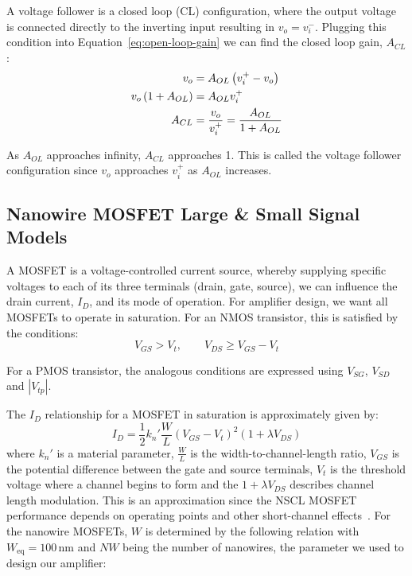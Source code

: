 \documentclass[11pt,a4paper]{article}
\begin{document}
A voltage follower is a closed loop (CL) configuration, where the output voltage is connected directly to the inverting input resulting in $v_o = v_i^-$. Plugging this condition into Equation~\eqref{eq:open-loop-gain} we can find the closed loop gain, $A_{CL}$:
\begin{align}
    v_o &= A_{OL}\left(v_i^+ - v_o\right) \notag \\
    v_o\left(1 + A_{OL}\right) &= A_{OL}v_i^+ \notag \\
    A_{CL}
        &= \frac{v_o}{v_i^+}
        = \frac{A_{OL}}{1 + A_{OL}}
    \label{eq:closed-loop-gain}
\end{align}

As $A_{OL}$ approaches infinity, $A_{CL}$ approaches 1. This is called the voltage follower configuration since $v_o$ approaches $v_i^+$ as $A_{OL}$ increases.
\subsection{Nanowire MOSFET Large \& Small Signal Models}

A MOSFET is a voltage-controlled current source, whereby supplying specific voltages to each of its three terminals (drain, gate, source), we can influence the drain current, ${I}_{D}$, and its mode of operation. For amplifier design, we want all MOSFETs to operate in saturation. For an NMOS transistor, this is satisfied by the conditions:
\begin{equation}
    V_{GS}>V_t, \qquad V_{DS} \geq V_{GS} - V_t
    \label{eq:saturation-condition}
\end{equation}

For a PMOS transistor, the analogous conditions are expressed using $V_{SG}$, $V_{SD}$ and $|V_{tp}|$.

The $I_D$ relationship for a MOSFET in saturation is approximately given by:
\begin{equation}
    {I}_{D}=\frac{1}{2}{k}_{n}'\frac{W}{L}({V}_{GS}-{V}_{t})^{2}(1 + \lambda V_{DS})
    \label{eq:mosfet-current}
\end{equation}
where ${k}_{n}'$ is a material parameter, $\frac{W}{L}$ is the width-to-channel-length ratio, ${V}_{GS}$ is the potential difference between the gate and source terminals, ${V}_{t}$ is the threshold voltage where a channel begins to form and the $1 + \lambda V_{DS}$ describes channel length modulation. 
This is an approximation since the NSCL MOSFET performance depends on operating points and other short-channel effects~\cite{brief}.
For the nanowire MOSFETs, $W$ is determined by the following relation with $W_{\mathrm{eq}} = 100\,\mathrm{nm}$ and $NW$ being the number of nanowires, the parameter we used to design our amplifier:
\end{document}
